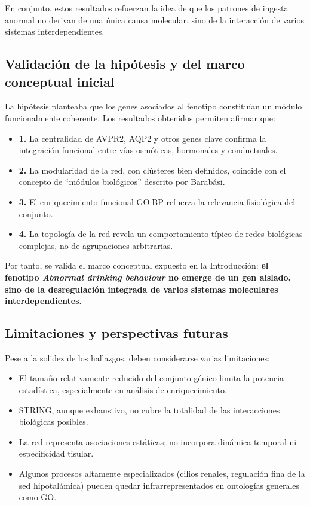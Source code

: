 En conjunto, estos resultados refuerzan la idea de que los patrones de ingesta anormal no derivan de una única causa molecular, sino de la interacción de varios sistemas interdependientes.

\subsection{Validación de la hipótesis y del marco conceptual inicial}
La hipótesis planteaba que los genes asociados al fenotipo constituían un módulo funcionalmente coherente. Los resultados obtenidos permiten afirmar que: 
\begin{itemize} 
    \item \textbf{1. }La centralidad de AVPR2, AQP2 y otros genes clave confirma la integración funcional entre vías osmóticas, hormonales y conductuales. 
    \item \textbf{2. }La modularidad de la red, con clústeres bien definidos, coincide con el concepto de “módulos biológicos” descrito por Barabási. 
    \item \textbf{3. }El enriquecimiento funcional GO:BP refuerza la relevancia fisiológica del conjunto. 
    \item \textbf{4. }La topología de la red revela un comportamiento típico de redes biológicas complejas, no de agrupaciones arbitrarias.
\end{itemize} 

Por tanto, se valida el marco conceptual expuesto en la Introducción: \textbf{el fenotipo \textit{Abnormal drinking behaviour} no emerge de un gen aislado, sino de la desregulación integrada de varios sistemas moleculares interdependientes}.

\subsection{Limitaciones y perspectivas futuras}
Pese a la solidez de los hallazgos, deben considerarse varias limitaciones:
\begin{itemize}
    \item El tamaño relativamente reducido del conjunto génico limita la potencia estadística, especialmente en análisis de enriquecimiento.
    \item STRING, aunque exhaustivo, no cubre la totalidad de las interacciones biológicas posibles.
    \item La red representa asociaciones estáticas; no incorpora dinámica temporal ni especificidad tisular.
    \item Algunos procesos altamente especializados (cilios renales, regulación fina de la sed hipotalámica) pueden quedar infrarrepresentados en ontologías generales como GO.
\end{itemize}

